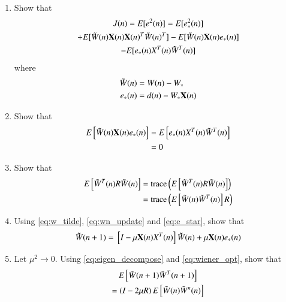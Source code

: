 \documentclass[journal,12pt,twocolumn]{IEEEtran}
\renewcommand\thesection{\arabic{section}}
\renewcommand\thesubsection{\thesection.\arabic{subsection}}
\begin{document}
\begin{enumerate}[label=\thesubsection.\arabic*
,ref=\thesubsection.\theenumi]
%
\item
Show that 
\begin{multline}
J(n)=E[e^{2}(n)]
=E[e_{*}^{2}(n)]
\\
 + E[\tilde W(n)\mathbf{X}(n) \mathbf{X}(n)^{T} \tilde W(n)^T] 
- E[ \tilde W(n)\mathbf{X}(n)e_{*}(n)] 
\\ 
- E[ e_{*}(n)X^{T}(n)\tilde W^T(n)]
\end{multline}
%
 where  
 \begin{align}
 \label{eq:w_tilde}
 \tilde W(n)&= W(n) - W_{*}\\
 e_{*}(n)&= d(n) - W_{*}\mathbf{X}(n)
 \label{eq:e_star}
 \end{align}

\item
Show that
\begin{align}
E{}\left[ \tilde W(n)\mathbf{X}(n)e_{*}(n)\right] &= E{}\left[ e_{*}(n)X^{T}(n)\tilde W^T(n)\right] 
\nonumber \\
&= 0
\end{align}

%
\item
Show that
\begin{align}
E{}\left[\tilde W^{T}(n) R \tilde W(n)\right] &= \text{trace}\left(E{}\left[\tilde W^{T}(n) R \tilde W(n)\right]\right)
\\
&= \text{trace}\left(E{}\left[\tilde W(n)\tilde W^{T}(n) \right]R\right)
\end{align}


\item
Using \eqref{eq:w_tilde}, \eqref{eq:wn_update} and \eqref{eq:e_star},  show that 
\begin{equation}
\tilde W(n+1) = {}\left[I - \mu \mathbf{X}(n) X^{T}(n) \right]\tilde W(n) + \mu \mathbf{X}(n)e_{*}(n)
\end{equation}
\item
Let $\mu^2 \to 0$.  Using \eqref{eq:eigen_decompose} and \eqref{eq:wiener_opt}, show that
\begin{multline}
E{}\left[\tilde W(n+1)\tilde W^{T}(n+1)\right] 
\\
= \left(I - 2\mu R\right)E{}\left[\tilde W(n)\tilde W^{n}(n)\right]
\end{multline}


\end{enumerate}
\end{document}
